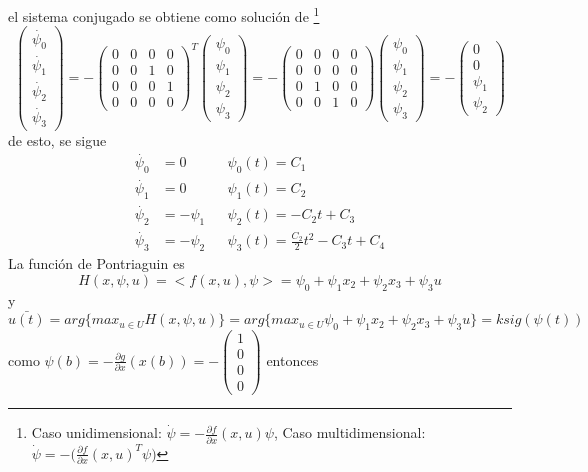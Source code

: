 \documentclass{ejercicios}
\begin{document}
\begin{solution}
  el sistema conjugado se obtiene como solución de \footnote{Caso unidimensional: $\dot{\psi} = -\frac{\partial f}{\partial x}(x,u)\psi$, 
  Caso multidimensional: $\dot{\psi} = -\Big(\frac{\partial f}{\partial x}(x,u)^{T}\psi\Big)$}
  \[
    \begin{pmatrix}
      \dot{\psi_0} \\ \dot{\psi_1} \\ \dot{\psi_2} \\ \dot{\psi_3}
    \end{pmatrix} = - 
    \begin{pmatrix}
      0 & 0 & 0 & 0 \\ 
      0 & 0 & 1 & 0 \\ 
      0 & 0 & 0 & 1 \\ 
      0 & 0 & 0 & 0  
    \end{pmatrix}^{T}
    \begin{pmatrix}
      \psi_0 \\ \psi_1 \\ \psi_2 \\ \psi_3
    \end{pmatrix} = - 
    \begin{pmatrix}
      0 & 0 & 0 & 0 \\ 
      0 & 0 & 0 & 0 \\ 
      0 & 1 & 0 & 0 \\ 
      0 & 0 & 1 & 0  
    \end{pmatrix}
    \begin{pmatrix}
      \psi_0 \\ \psi_1 \\ \psi_2 \\ \psi_3
    \end{pmatrix} = - 
    \begin{pmatrix}
      0 \\ 0 \\ \psi_1 \\ \psi_2
    \end{pmatrix}
  \]
  de esto, se sigue 
  \begin{align*}
    \dot{\psi_0} &= 0 && \psi_0(t) = C_1 \\
    \dot{\psi_1} &= 0 && \psi_1(t) = C_2 \\
    \dot{\psi_2} &= -\psi_1 && \psi_2(t) = -C_2t + C_3 \\
    \dot{\psi_3} &= - \psi_2 && \psi_3(t) = \frac{C_2}{2}t^2-C_3t+C_4
  \end{align*}
  La función de Pontriaguin es 
  \[H(x,\psi,u) = <f(x,u),\psi> = \psi_0 + \psi_1 x_2 + \psi_2 x_3 + \psi_3 u\]
  y 
  \[\bar{u(t)} = arg\{max_{u\in U}H(x,\psi,u)\} = arg\{max_{u\in U}\psi_0 + \psi_1 x_2 + \psi_2 x_3 + \psi_3 u\} = ksig(\psi(t))\]
  como $\psi(b) = -\frac{\partial g}{\partial x}(x(b)) = - \begin{pmatrix} 1 \\ 0 \\ 0 \\ 0 \end{pmatrix}$ entonces


\end{solution}
\end{document}
